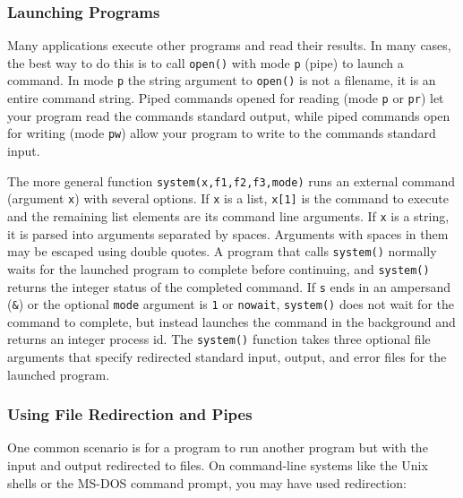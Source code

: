 \subsubsection[Launching Programs]{Launching Programs}

Many applications execute other programs and read
their results. In many cases, the best way to do this is to
call \texttt{open()} with mode
\texttt{{\textquotedbl}p{\textquotedbl}} (pipe) to
launch a command. In mode \texttt{{\textquotedbl}p{\textquotedbl}}
the string argument to \texttt{open()}
is not a filename, it is an entire command string. Piped commands
opened for reading (mode \texttt{{\textquotedbl}p{\textquotedbl}} or
\texttt{{\textquotedbl}pr{\textquotedbl}}) let your program read
the command{\textquotesingle}s standard output, while piped commands
open for writing (mode \texttt{{\textquotedbl}pw{\textquotedbl}}) allow
your program to write to the command{\textquotesingle}s standard input.

The more general function \texttt{system(x,f1,f2,f3,mode)} runs an external
command (argument \texttt{x}) with several options. If
\texttt{x} is a list, \texttt{x[1]} is the command to execute and the
remaining list elements are its command line arguments. If \texttt{x}
is a string, it is parsed into arguments separated by spaces. Arguments
with spaces in them may be escaped using double quotes. A program that
calls \texttt{system()} normally waits for the launched
program to complete before continuing, and \texttt{system()} returns
the integer status of the completed command. If \texttt{s} ends in an
ampersand (\texttt{\&}) or the optional \texttt{mode} argument is
\texttt{1} or \texttt{{\textquotedbl}nowait{\textquotedbl}},
\texttt{system()} does not wait for the command to complete, but
instead launches the command in the background and returns an integer
process id. The \texttt{system()} function takes three optional file
arguments that specify redirected standard input, output, and error
files for the launched program.

\subsubsection[Using File Redirection and Pipes]{Using File Redirection
and Pipes}

One common scenario is for a program to run
another program but with the input and output redirected to files. On
command-line systems like the Unix shells or the MS-DOS command prompt,
you may have used redirection:

